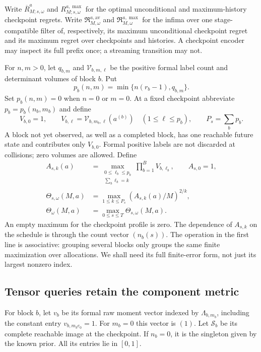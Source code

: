 Write $\overline R^a_{M;s,\omega}$ and $R^{a,\max}_{M;s,\omega}$ for
the optimal unconditional and maximum-history checkpoint regrets.
Write $\mathfrak R^{a,\mathrm{av}}_{M,\omega}$ and
$\mathfrak R^{a,\max}_{M,\omega}$ for the infima over one stage-compatible
filter of, respectively, its maximum unconditional checkpoint regret and
its maximum regret over checkpoints and histories. A checkpoint encoder
may inspect its full prefix once; a streaming transition may not.

For $n,m>0$, let $q_{b,m}$ and $\mathcal V_{b,m,\ell}$ be the positive
formal label count and determinant volumes of block $b$. Put
\[
 p_b(n,m)=\min\{n(r_b-1),q_{b,m}\}.
\]
Set $p_b(n,m)=0$ when $n=0$ or $m=0$. At a fixed checkpoint abbreviate
$p_b=p_b(n_b,m_b)$ and define
\begin{equation}\label{eq:block-volumes}
 V_{b,0}=1,\qquad
 V_{b,\ell}=\mathcal V_{b,m_b,\ell}(a^{(b)})
       \quad(1\le\ell\le p_b),\qquad P_s=\sum_b p_b.
\end{equation}
A block not yet observed, as well as a completed block, has one reachable
future state and contributes only $V_{b,0}$. Formal positive labels are
not discarded at collisions; zero volumes are allowed. Define
\begin{equation}\label{eq:composition-volumes}
 \begin{split}
 A_{s,k}(a)&=
 \max_{\substack{0\le\ell_b\le p_b\\\sum_b\ell_b=k}}
              \prod_{b=1}^B V_{b,\ell_b},\qquad A_{s,0}=1,\\
 \Theta_{s,\omega}(M,a)&=
       \max_{1\le k\le P_s}(A_{s,k}(a)/M)^{2/k},\\
 \Theta_\omega(M,a)&=\max_{0\le s\le T}\Theta_{s,\omega}(M,a).
 \end{split}
\end{equation}
An empty maximum for the checkpoint profile is zero. The dependence of
$A_{s,k}$ on the schedule is through the count vector $(n_b(s))$.
The operation in the first line is associative: grouping several blocks
only groups the same finite maximization over allocations. We shall need
its full finite-error form, not just its largest nonzero index.

\subsection{Tensor queries retain the component metric}
For block $b$, let $v_b$ be its formal raw moment vector indexed by
$\Lambda_{b,m_b}$, including the constant entry $v_{b,m_be_0}=1$.
For $m_b=0$ this vector is $(1)$. Let $\mathcal S_b$ be its complete
reachable image at the checkpoint. If $n_b=0$, it is the singleton given
by the known prior. All its entries lie in $[0,1]$.

